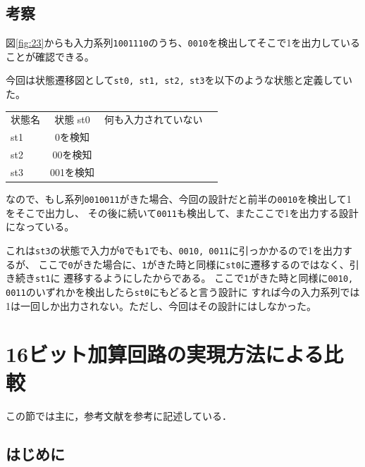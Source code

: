 \documentclass[uplatex]{jsarticle}
\begin{document}
\subsection{考察}

図\ref{fig:23}からも入力系列{\tt 1001110}のうち、{\tt 0010}を検出してそこで1を出力していることが確認できる。

今回は状態遷移図として{\tt st0, st1, st2, st3}を以下のような状態と定義していた。

\begin{table}[htb]
  \begin{tabular}{lcrr}
    	状態名 & 状態
	st0 & 何も入力されていない \\
     	st1 & 0を検知  \\
	st2 & 00を検知 \\
	st3 & 001を検知 \\
  \end{tabular}
\end{table}

なので、もし系列{\tt 0010011}がきた場合、今回の設計だと前半の{\tt 0010}を検出して1をそこで出力し、
その後に続いて{\tt 0011}も検出して、またここで1を出力する設計になっている。

これは{\tt st3}の状態で入力が{\tt 0}でも{\tt 1}でも、{\tt 0010, 0011}に引っかかるので1を出力するが、
ここで{\tt 0}がきた場合に、{\tt 1}がきた時と同様に{\tt st0}に遷移するのではなく、引き続き{\tt st1}に
遷移するようにしたからである。
ここで{\tt 1}がきた時と同様に{\tt 0010, 0011}のいずれかを検出したら{\tt st0}にもどると言う設計に
すれば今の入力系列では1は一回しか出力されない。ただし、今回はその設計にはしなかった。

\clearpage

\section{16ビット加算回路の実現方法による比較}

この節では主に，参考文献\cite{altera}を参考に記述している．

\subsection{はじめに}
\end{document}
